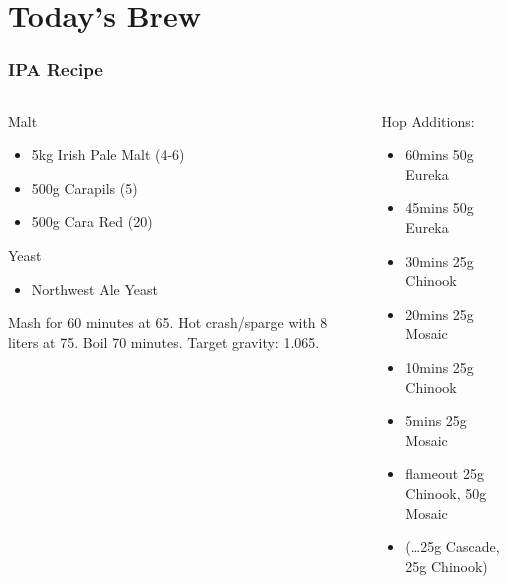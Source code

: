 \documentclass{beamer}
\begin{document}
\section{Today's Brew}
\begin{frame}\frametitle{IPA Recipe}
  \begin{columns}
    \begin{column}{.5\textwidth}
      Malt
      \begin{itemize}
      \item 5kg Irish Pale Malt (4-6)
      \item 500g Carapils  (5)
      \item 500g Cara Red  (20)
      \end{itemize}
      Yeast
      \begin{itemize}
      \item Northwest Ale Yeast
      \end{itemize}
      Mash for 60 minutes at 65\degree. Hot crash/sparge with 8 liters at 75\degree. Boil 70 minutes.  Target gravity: 1.065.
    \end{column}
    \begin{column}{.5\textwidth}
      Hop Additions:
    \begin{itemize}
    \item 60mins 50g Eureka
    \item 45mins 50g Eureka
    \item 30mins 25g Chinook
    \item 20mins 25g Mosaic
    \item 10mins 25g Chinook
    \item 5mins 25g Mosaic
    \item flameout 25g Chinook, 50g Mosaic
    \item (\dots 25g Cascade, 25g Chinook)
    \end{itemize}
  \end{column}
\end{columns}
\end{frame}
\end{document}
